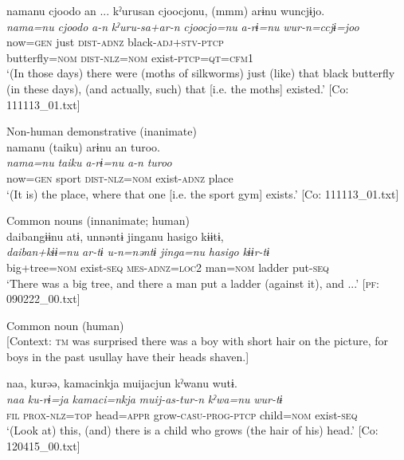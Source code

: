 {\TM}
\glll namanu  cjoodo  an ...  kˀurusan   cjoocjonu,  (mmm)  arɨnu  wuncjɨjo.\\
      \textit{nama=nu}  \textit{cjoodo}  \textit{a-n}  \textit{kˀuru-sa+ar-n}   \textit{cjoocjo=nu}    \textit{a-rɨ=nu}  \textit{wur-n=ccjɨ=joo}\\
      now=\textsc{gen}  just  \textsc{dist}-\textsc{adnz}  black-\textsc{adj}+\textsc{stv}-\textsc{ptcp}\\  butterfly=\textsc{nom}    \textsc{dist}-\textsc{nlz}=\textsc{nom}  exist-\textsc{ptcp}=\textsc{qt}=\textsc{cfm}1\\
\glt ‘(In those days) there were (moths of silkworms) just (like) that black butterfly (in these days), (and actually, such) that [i.e. the moths] existed.’ [Co: 111113\_01.txt]
\z

\ex Non-human demonstrative (inanimate)\\
{\TM}
\glll  namanu  ({\textbar}taiku{\textbar})  arɨnu  an  turoo.\\
\textit{nama=nu}  \textit{taiku}  \textit{a-rɨ=nu}  \textit{a-n}  \textit{turoo}\\
now=\textsc{gen}  sport  \textsc{dist}-\textsc{nlz}=\textsc{nom}  exist-\textsc{adnz}  place\\
\glt ‘(It is) the place, where that one [i.e. the sport gym] exists.’ [Co: 111113\_01.txt]
\z

\ex Common nouns (innanimate; human)\\
{\TM}
\glll  daibangɨɨnu  atɨ,  unnəntɨ  jinganu  {\textbar}hasigo{\textbar}   kɨɨtɨ,\\
\textit{daiban+kɨɨ=nu}  \textit{ar-tɨ}  \textit{u-n=nəntɨ}  \textit{jinga=nu}  \textit{hasigo}      \textit{kɨɨr-tɨ}\\
big+tree=\textsc{nom}  exist-\textsc{seq}  \textsc{mes}-\textsc{adnz}=\textsc{loc2}  man=\textsc{nom}  ladder  put-\textsc{seq}\\
\glt ‘There was a big tree, and there a man put a ladder (against it), and ...’ [\textsc{pf}: 090222\_00.txt]
\z

\ex Common noun (human)\\{}
[Context: \textsc{tm} was surprised there was a boy with short hair on the picture, for boys in the past usullay have their heads shaven.]

{\TM}
\glll naa,  kurəə,  kamacinkja  muijacjun     kˀwanu  wutɨ.\\
      \textit{naa}  \textit{ku-rɨ=ja}  \textit{kamaci=nkja}  \textit{muij-as-tur-n}    \textit{kˀwa=nu}  \textit{wur-tɨ}\\
      \textsc{fil}  \textsc{prox}-\textsc{nlz}=\textsc{top}  head=\textsc{appr}  grow-\textsc{casu}-\textsc{prog}-\textsc{ptcp}      child=\textsc{nom}  exist-\textsc{seq}\\
\glt ‘(Look at) this, (and) there is a child who grows (the hair of his) head.’ [Co: 120415\_00.txt]
\z

